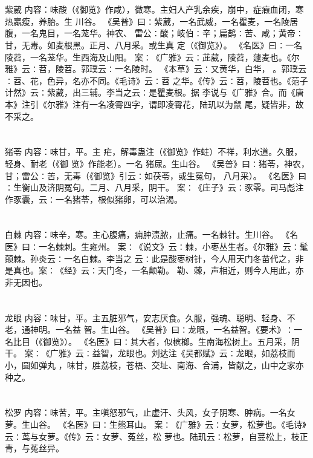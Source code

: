 \documentclass[12pt,UTF8]{ctexbook}
\begin{document}
\chapter{}紫葳
内容：味酸（《御览》作咸），微寒。主妇人产乳余疾，崩中，症瘕血闭，寒热羸瘦，养胎。生 
川谷。 
《吴普》曰∶紫葳，一名武威，一名瞿麦，一名陵居腹，一名鬼目，一名茏华。神农、 
雷公∶酸；岐伯∶辛；扁鹊∶苦、咸；黄帝∶甘，无毒。如麦根黑。正月、八月采。或生真 
定（《御览》）。 
《名医》曰∶一名陵苕，一名茏华。生西海及山阳。 
案∶《广雅》云∶茈葳，陵苕，蘧麦也。《尔雅》云∶苕，陵苕。郭璞云∶一名陵时。 
《本草》云∶又黄华，白华， 。郭璞云∶苕、花，色异，名亦不同。《毛诗》云∶苕 
之华。《传》云∶苕，陵苕也。《范子计然》云∶紫葳，出三辅。李当之云∶是瞿麦根。据 
李说与《广雅》合。而《唐本》注引《尔雅》注有一名凌霄四字，谓即凌霄花，陆玑以为鼠 
尾，疑皆非，故不采之。 


\chapter{}猪苓
内容：味甘，平。主 疟，解毒蛊注（《御览》作蛀）不祥，利水道。久服，轻身、耐老（《御 
览》作能老）。一名 猪尿。生山谷。 
《吴普》曰∶猪苓，神农，甘；雷公∶苦，无毒（《御览》引云∶如茯苓，或生冤句， 
八月采）。 
《名医》曰∶生衡山及济阴冤句。二月、八月采，阴干。 
案∶《庄子》云∶豕零。司马彪注作豕囊，云∶一名猪苓，根似猪卵，可以治渴。 


\chapter{}白棘
内容：味辛，寒。主心腹痛，痈肿渍脓，止痛。一名棘针。生川谷。 
《名医》曰∶一名棘刺。生雍州。 
案∶《说文》云∶棘，小枣丛生者。《尔雅》云∶髦颠棘。孙炎云∶一名白棘。李当之 
云∶此是酸枣树针，今人用天门冬苗代之，非是真也。案∶《经》云∶天门冬，一名颠勒。 
勒、棘，声相近，则今人用此，亦非无因也。 


\chapter{}龙眼
内容：味甘，平。主五脏邪气，安志厌食。久服，强魂、聪明、轻身、不老，通神明。一名益 
智。生山谷。 
《吴普》曰∶龙眼，一名益智。《要术》∶一名比目（《御览》）。 
《名医》曰∶其大者，似槟榔。生南海松树上。五月采，阴干。 
案∶《广雅》云∶益智，龙眼也。刘达注《吴都赋》云∶龙眼，如荔枝而小，圆如弹丸 
，味甘，胜荔枝，苍梧、交址、南海、合浦，皆献之，山中之家亦种之。 


\chapter{}松罗
内容：味苦，平。主嗔怒邪气，止虚汗、头风，女子阴寒、肿病。一名女萝。生山谷。 
《名医》曰∶生熊耳山。 
案∶《广雅》云∶女萝，松萝也。《毛诗》云∶茑与女萝。《传》云∶女萝、菟丝，松 
萝也。陆玑云∶松萝，自蔓松上，枝正青，与菟丝异。 
\end{document}
